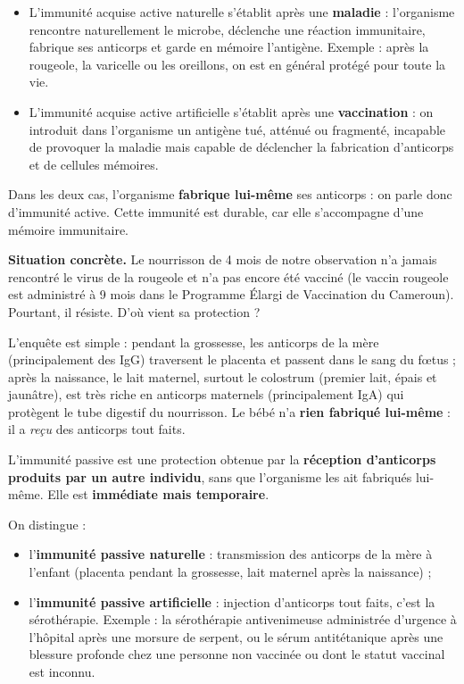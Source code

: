 \documentclass[11pt]{article}
\newcommand{\cle}[1]{{\popxbold\color{popdark}#1}}
\newcounter{popsec}
\newcounter{popsub}
\newcommand{\courssub}[1]{%
  \stepcounter{popsub}%
  \par\vspace{9pt}\noindent{\popxbold\fontsize{11.5}{13}\selectfont\color{popink}{\color{poporange}\thepopsec.\thepopsub}\hspace{6pt}#1}\par\nopagebreak\vspace{4pt}
}
\begin{document}
\begin{itemize}
\item L'\cle{immunité acquise active naturelle} s'établit après une \textbf{maladie} : l'organisme rencontre naturellement le microbe, déclenche une réaction immunitaire, fabrique ses anticorps et garde en mémoire l'antigène. Exemple : après la rougeole, la varicelle ou les oreillons, on est en général protégé pour toute la vie.
\item L'\cle{immunité acquise active artificielle} s'établit après une \textbf{vaccination} : on introduit dans l'organisme un antigène tué, atténué ou fragmenté, incapable de provoquer la maladie mais capable de déclencher la fabrication d'anticorps et de cellules mémoires.
\end{itemize}

Dans les deux cas, l'organisme \textbf{fabrique lui-même} ses anticorps : on parle donc d'\cle{immunité active}. Cette immunité est durable, car elle s'accompagne d'une mémoire immunitaire.

\courssub{Immunité passive : la protection prêtée}

\textbf{Situation concrète.} Le nourrisson de 4 mois de notre observation n'a jamais rencontré le virus de la rougeole et n'a pas encore été vacciné (le vaccin rougeole est administré à 9 mois dans le Programme Élargi de Vaccination du Cameroun). Pourtant, il résiste. D'où vient sa protection ?

L'enquête est simple : pendant la grossesse, les anticorps de la mère (principalement des IgG) traversent le \cle{placenta} et passent dans le sang du fœtus ; après la naissance, le \cle{lait maternel}, surtout le colostrum (premier lait, épais et jaunâtre), est très riche en anticorps maternels (principalement IgA) qui protègent le tube digestif du nourrisson. Le bébé n'a \textbf{rien fabriqué lui-même} : il a \emph{reçu} des anticorps tout faits.

\begin{definition}
L'\cle{immunité passive} est une protection obtenue par la \textbf{réception d'anticorps produits par un autre individu}, sans que l'organisme les ait fabriqués lui-même. Elle est \textbf{immédiate mais temporaire}.
\end{definition}

On distingue :
\begin{itemize}
\item l'\textbf{immunité passive naturelle} : transmission des anticorps de la mère à l'enfant (placenta pendant la grossesse, lait maternel après la naissance) ;
\item l'\textbf{immunité passive artificielle} : injection d'anticorps tout faits, c'est la \cle{sérothérapie}. Exemple : la sérothérapie antivenimeuse administrée d'urgence à l'hôpital après une morsure de serpent, ou le sérum antitétanique après une blessure profonde chez une personne non vaccinée ou dont le statut vaccinal est inconnu.
\end{itemize}
\end{document}
